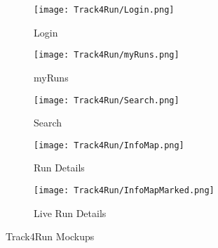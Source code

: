 
\begin{figure}[!ht]
  \centering
  \begin{subfigure}[b]{0.4\linewidth}
    \texttt{[image: Track4Run/Login.png]}
    \caption{Login}
  \end{subfigure}\hfill
  \begin{subfigure}[b]{0.4\linewidth}
    \texttt{[image: Track4Run/myRuns.png]}
    \caption{myRuns}
  \end{subfigure}
  \par\bigskip
  \begin{subfigure}[b]{0.3\linewidth}
    \texttt{[image: Track4Run/Search.png]}
    \caption{Search}
  \end{subfigure}\hfill
  \begin{subfigure}[b]{0.3\linewidth}
    \texttt{[image: Track4Run/InfoMap.png]}
    \caption{Run Details}
  \end{subfigure}\hfill
  \begin{subfigure}[b]{0.3\linewidth}
    \texttt{[image: Track4Run/InfoMapMarked.png]}
    \caption{Live Run Details}
  \end{subfigure}
  \caption{Track4Run Mockups}
\end{figure}